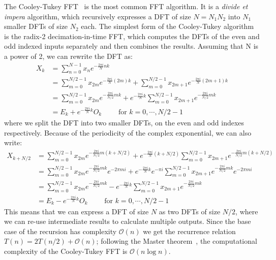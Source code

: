     \begin{example}
    The Cooley-Tukey FFT~\cite{cooley1965algorithm} is the most common FFT algorithm. It is a \textit{divide et impera} algorithm, which recursively expresses a DFT of
    size $N = N_1 N_2$ into $N_1$ smaller DFTs of size $N_2$ each. The simplest form of the Cooley-Tukey algorithm is the radix-2 decimation-in-time FFT, which computes the DFTs of
    the even and odd indexed inputs separately and then combines the results. Assuming that N is a power of 2, we can rewrite the DFT as:
    \begin{align*}
        X_k & = \sum_{n=0}^{N-1} x_n e^{-\frac{2\pi i}{N}nk} \\
            & = \sum_{m=0}^{N/2-1}x_{2m}e^{-\frac{2\pi i}{N}(2m)k} + \sum_{m=0}^{N/2-1}x_{2m+1}e^{-\frac{2\pi i}{N}(2m+1)k} \\
            & = \sum_{m=0}^{N/2-1}x_{2m}e^{-\frac{2\pi i}{N/2}mk} + e^{-\frac{2\pi i}{N}k}\sum_{m=0}^{N/2-1}x_{2m+1}e^{-\frac{2\pi i}{N/2}mk} \\
            & = E_k + e^{-\frac{2\pi i}{N}k}O_k \qquad \text{ for } k = 0, \cdots, N/2-1
    \end{align*}
    where we split the DFT into two smaller DFTs, on the even and odd indexes respectively. Because of the periodicity of the complex exponential, we can also write:
    \begin{align*}
        X_{k+N/2} & = \sum_{m=0}^{N/2-1}x_{2m}e^{-\frac{2\pi i}{N/2}m(k+N/2)} + e^{-\frac{2\pi i}{N}(k+N/2)}\sum_{m=0}^{N/2-1}x_{2m+1}e^{-\frac{2\pi i}{N/2}m(k+N/2)} \\
            & = \sum_{m=0}^{N/2-1}x_{2m}e^{-\frac{2\pi i}{N/2}mk}e^{-2\pi mi} + e^{-\frac{2\pi i}{N}k}e^{-\pi i}\sum_{m=0}^{N/2-1}x_{2m+1}e^{-\frac{2\pi i}{N/2}mk}e^{-2\pi mi} \\
            & = \sum_{m=0}^{N/2-1}x_{2m}e^{-\frac{2\pi i}{N/2}mk} - e^{-\frac{2\pi i}{N}k}\sum_{m=0}^{N/2-1}x_{2m+1}e^{-\frac{2\pi i}{N/2}mk} \\
            & = E_k - e^{-\frac{2\pi i}{N}k}O_k \qquad \text{ for } k = 0, \cdots, N/2-1
    \end{align*}
    This means that we can express a DFT of size $N$ as two DFTs of size $N/2$, where we can re-use intermediate results to calculate multiple outputs. 
    Since the base case of the recursion has complexity $\mathcal{O}(n)$ we get the recurrence relation $T(n) = 2T(n/2) + \mathcal{O}(n)$;
    following the Master theorem~\cite{bentley1980general}, the computational complexity of the Cooley-Tukey FFT is $\mathcal{O}(n\log n)$.
    \end{example}